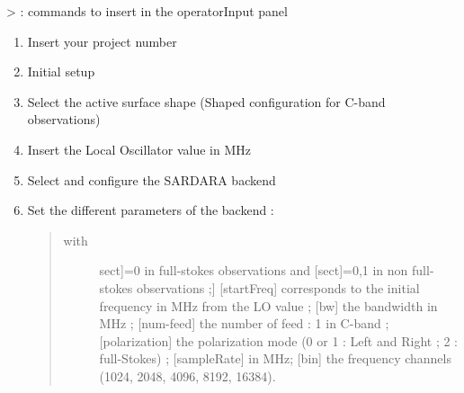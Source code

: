 \documentclass[letterpaper,10pt,english]{sphinxmanual}
\begin{document}
\textgreater{} : commands to insert in the operatorInput panel
\begin{enumerate}
\item {} 
Insert your project number
\begin{quote}

\end{quote}

\item {} 
Initial setup
\begin{quote}


\end{quote}

\item {} 
Select the active surface shape (Shaped configuration for C-band observations)
\begin{quote}

\end{quote}

\item {} 
Insert the Local Oscillator value in MHz
\begin{quote}

\end{quote}

\item {} 
Select and configure the SARDARA backend
\begin{quote}


\end{quote}

\item {} 
Set the different parameters of the backend :
\begin{quote}

\begin{description}
\item[{with}] \leavevmode{[}{[}sect{]}=0 in full-stokes observations and {[}sect{]}=0,1 in non full-stokes observations ;{]}
{[}startFreq{]} corresponds to the initial frequency in MHz from the LO value ;
{[}bw{]} the bandwidth in MHz ;
{[}num-feed{]} the number of feed : 1 in C-band ;
{[}polarization{]} the polarization mode (0 or 1 : Left and
Right ; 2 : full-Stokes) ;
{[}sampleRate{]} in MHz;
{[}bin{]} the frequency channels (1024, 2048, 4096, 8192, 16384).


\end{description}
\end{quote}
\end{enumerate}
\end{document}
